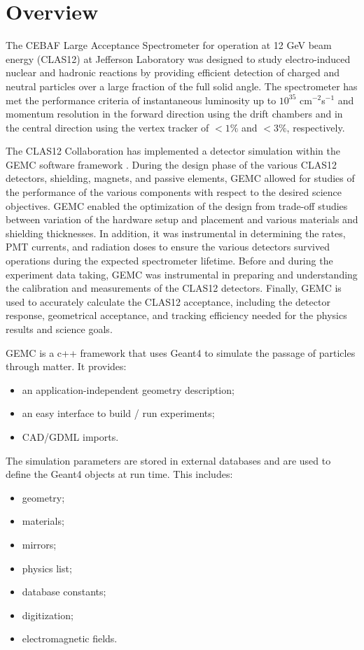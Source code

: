 \section{Overview}

The CEBAF Large Acceptance Spectrometer for operation at 12 GeV beam energy (CLAS12) \cite{clas12-nim}  at Jefferson Laboratory was designed to study
electro-induced nuclear and hadronic reactions by providing efficient detection of charged and neutral particles over a large
fraction of the full solid angle. The spectrometer has met the performance criteria of instantaneous luminosity up
to $10^{35}$ cm$^{-2}$s$^{-1}$ and momentum resolution in the forward direction using the drift chambers and in the central
direction using the vertex tracker of $< 1\%$ and $< 3\%$, respectively.

The CLAS12 Collaboration has implemented a detector simulation within the GEMC software framework \cite{GEMC}.
During the design phase of the various CLAS12 detectors, shielding, magnets, and passive elements, GEMC allowed for studies of the
performance of the various components with respect to the desired science objectives.
GEMC enabled the optimization of the design from trade-off studies between variation of the hardware setup and placement
and various materials and shielding thicknesses.
In addition, it was instrumental in determining the rates, PMT currents, and radiation doses to ensure the various detectors
survived operations during the expected spectrometer lifetime.
Before and during the experiment data taking, GEMC was instrumental in preparing and understanding the calibration
and measurements of the CLAS12 detectors.
Finally, GEMC is used to accurately calculate the CLAS12 acceptance, including the detector response, geometrical acceptance,
and tracking efficiency needed for the physics results and science goals.


GEMC is a c++ framework that uses Geant4 \cite{geant4} to simulate the passage of particles through matter. It provides:
\begin{itemize}
	\item an application-independent geometry description;
	\item an easy interface to build / run experiments;
	\item CAD/GDML imports.
\end{itemize}

The simulation parameters are stored in external databases and are used to define the Geant4 objects at run time. This includes:
\begin{itemize}
	\item geometry;
	\item materials;
	\item mirrors;
	\item physics list;
	\item database constants;
	\item digitization;
	\item electromagnetic fields.
\end{itemize}

